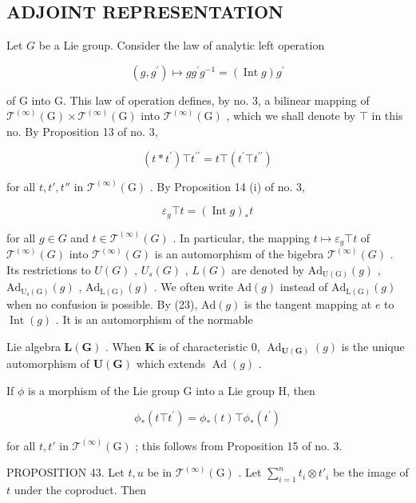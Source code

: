 \subsection{ADJOINT REPRESENTATION}

Let \(G\) be a Lie group. Consider the law of analytic left operation

\[
(g, g ^ {\prime}) \mapsto g g ^ {\prime} g ^ {- 1} = (\operatorname{Int} g) g ^ {\prime}
\]

of G into G. This law of operation defines, by no. 3, a bilinear mapping of \(\mathcal{T}^{(\infty)}(\mathrm{G})\times \mathcal{T}^{(\infty)}(\mathrm{G})\) into \(\mathcal{T}^{(\infty)}(\mathrm{G})\) , which we shall denote by \(\top\) in this no. By Proposition 13 of no. 3,

\[
(t * t ^ {\prime}) \top t ^ {\prime \prime} = t \top (t ^ {\prime} \top t ^ {\prime \prime})\tag{22}
\]

for all \(t, t', t''\) in \(\mathcal{T}^{(\infty)}(\mathrm{G})\) . By Proposition 14 (i) of no. 3,

\[
\varepsilon_ {g} \top t = (\operatorname{Int} g) _ {*} t\tag{23}
\]

for all \(g \in G\) and \(t \in \mathcal{T}^{(\infty)}(G)\) . In particular, the mapping \(t \mapsto \varepsilon_{g} \top t\) of \(\mathcal{T}^{(\infty)}(G)\) into \(\mathcal{T}^{(\infty)}(G)\) is an automorphism of the bigebra \(\mathcal{T}^{(\infty)}(G)\) . Its restrictions to \(U(G)\) , \(U_{s}(G)\) , \(L(G)\) are denoted by \(\mathrm{Ad}_{\mathrm{U(G)}}(g)\) , \(\mathrm{Ad}_{\mathrm{U_s(G)}}(g)\) , \(\mathrm{Ad}_{\mathrm{L(G)}}(g)\) . We often write \(\mathrm{Ad}(g)\) instead of \(\mathrm{Ad}_{\mathrm{L(G)}}(g)\) when no confusion is possible. By (23), \(\mathrm{Ad}(g)\) is the tangent mapping at \(e\) to \(\operatorname{Int}(g)\) . It is an automorphism of the normable

Lie algebra \(\mathbf{L}(\mathbf{G})\) . When \(\mathbf{K}\) is of characteristic 0, \(\operatorname{Ad}_{\mathbf{U}(\mathbf{G})}(g)\) is the unique automorphism of \(\mathbf{U}(\mathbf{G})\) which extends \(\operatorname{Ad}(g)\) .

If \(\phi\) is a morphism of the Lie group G into a Lie group H, then

\[
\phi_ {*} (t \top t ^ {\prime}) = \phi_ {*} (t) \top \phi_ {*} (t ^ {\prime})\tag{24}
\]

for all \(t, t'\) in \(\mathcal{T}^{(\infty)}(\mathrm{G})\) ; this follows from Proposition 15 of no. 3.

PROPOSITION 43. Let \(t, u\) be in \(\mathcal{T}^{(\infty)}(\mathrm{G})\) . Let \(\sum_{i=1}^{n} t_i \otimes t'_i\) be the image of \(t\) under the coproduct. Then

